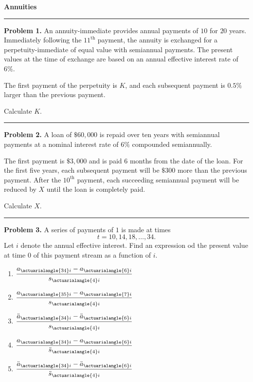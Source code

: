 \documentclass[11pt]{article}
\begin{document}
\begin{center}
    {\Large \textbf{Annuities}}\\
\end{center}

\vspace{10pt}

\hrule

\medskip

\textbf{Problem 1.} An annuity-immediate provides annual payments of $10$ for $20$ years. Immediately following the $11^{\text{th}}$ payment, the annuity is exchanged for a perpetuity-immediate of equal value with semiannual payments. The present values at the time of exchange are based on an annual effective interest rate of $6\%$.

The first payment of the perpetuity is $K$, and each subsequent payment is $0.5\%$ larger than the previous payment.

Calculate $K$.

\medskip

\hrule


\medskip


\textbf{Problem 2.} A loan of $\$60{,}000$ is repaid over ten years with semiannual payments at a nominal interest rate of $6\%$ compounded semiannually.

The first payment is $\$3{,}000$ and is paid 6 months from the date of the loan. For the first five years, each subsequent payment will be $\$300$ more than the previous payment. After the $10^{\text{th}}$ payment, each succeeding semiannual payment will be reduced by $X$ until the loan is completely paid.

Calculate $X$.

\medskip

\hrule


\textbf{Problem 3.} A series of payments of $1$ is made at times
\[
t=10,14,18,\ldots,34.
\]
Let $i$ denote the annual effective interest. Find an expression od the present value at time $0$ of this payment stream as a function of $i$.

\begin{enumerate}[label=(\Alph*), leftmargin=2.2em]
    \item $\displaystyle \frac{a_{\actuarialangle{34}i}-a_{\actuarialangle{6}i}}{s_{\actuarialangle{4}i}}$
    \item $\displaystyle \frac{a_{\actuarialangle{35}i}-a_{\actuarialangle{7}i}}{s_{\actuarialangle{4}i}}$
    \item $\displaystyle \frac{\ddot{a}_{\actuarialangle{34}i}-\ddot{a}_{\actuarialangle{6}i}}{s_{\actuarialangle{4}i}}$
    \item $\displaystyle \frac{a_{\actuarialangle{34}i}-a_{\actuarialangle{6}i}}{\ddot{s}_{\actuarialangle{4}i}}$
    \item $\displaystyle \frac{\ddot{a}_{\actuarialangle{34}i}-\ddot{a}_{\actuarialangle{6}i}}{\ddot{s}_{\actuarialangle{4}i}}$
\end{enumerate}
\end{document}
